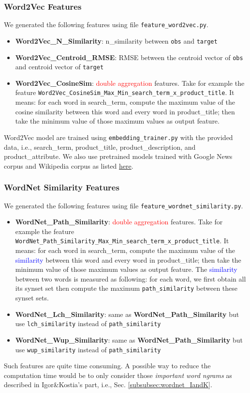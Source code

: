 \documentclass[12pt]{article}
\begin{document}
{{\subsubsection{Word2Vec Features}
We generated the following features using file \texttt{feature\_word2vec.py}.
\begin{itemize}
\item \textbf{Word2Vec\_N\_Similarity}: n\_similarity between \texttt{obs} and \texttt{target}
\item \textbf{Word2Vec\_Centroid\_RMSE}: RMSE between the centroid vector of \texttt{obs} and centroid vector of \texttt{target}
\item \textbf{Word2Vec\_CosineSim}: \textcolor{red}{double aggregation} features. Take for example the feature \texttt{Word2Vec\_CosineSim\_Max\_Min\_search\_term\_x\_product\_title}. It means: for each word in search\_term, compute the maximum value of the cosine similarity between this word and every word in product\_title; then take the minimum value of those maximum values as output feature.
\end{itemize}
Word2Vec model are trained using \texttt{embedding\_trainer.py} with the provided data, i.e., search\_term, product\_title, product\_description, and product\_attribute. We also use pretrained models trained with Google News corpus and Wikipedia corpus as listed \href{https://github.com/3Top/word2vec-api}{here}.

\subsubsection{WordNet Similarity Features}
\label{subsec:wordnet}
We generated the following features using file \texttt{feature\_wordnet\_similarity.py}.
\begin{itemize}
\item \textbf{WordNet\_Path\_Similarity}: \textcolor{red}{double aggregation} features. Take for example the feature \texttt{WordNet\_Path\_Similarity\_Max\_Min\_search\_term\_x\_product\_title}. It means: for each word in search\_term, compute the maximum value of the \textcolor{blue}{similarity} between this word and every word in product\_title; then take the minimum value of those maximum values as output feature. The \textcolor{blue}{similarity} between two words is measured as following: for each word, we first obtain all its synset set then compute the maximum \texttt{path\_similarity} between these synset sets.
\item \textbf{WordNet\_Lch\_Similarity}: same as \textbf{WordNet\_Path\_Similarity} but use \texttt{lch\_similarity} instead of \texttt{path\_similarity}
\item \textbf{WordNet\_Wup\_Similarity}: same as \textbf{WordNet\_Path\_Similarity} but use \texttt{wup\_similarity} instead of \texttt{path\_similarity}
\end{itemize}
Such features are quite time consuming. A possible way to reduce the computation time would be to only consider those \emph{important word ngrams} as described in Igor\&Kostia's part, i.e., Sec. \ref{subsubsec:wordnet_IandK}.

}}
\end{document}

